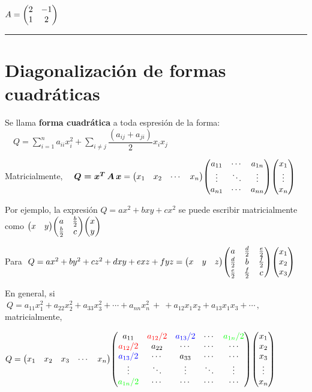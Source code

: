 $A=\mqty(2&-1\\1&2)$

\begin{center}
	\rule{200pt}{0.1pt}
\end{center}

\color{black}


\vspace{5mm}

\section{Diagonalización de formas cuadráticas}

Se llama \textbf{forma cuadrática} a toda espresión de la forma:
$\quad Q=\displaystyle \sum_{i=1}^n a_{ii}x_i^2 + \sum_{i\neq j} \dfrac{(a_{ij}+a_{ji})}{2} x_ix_j$

Matricialmente, $ \quad \boldsymbol{Q=x^T\, A\, x} = 
\mqty(x_1&x_2&\cdots &x_n) \mqty( a_{11} & \cdots  & a_{1n} \\ \vdots & \ddots & \vdots \\ a_{n1} & \cdots  & a_{nn}) \mqty(x_1\\ \vdots \\ x_n)$


Por ejemplo, la expresión $Q=ax^2+bxy+cx^2$ se puede escribir matricialmente como $\mqty(x&y) \mqty(a&\frac b 2 \\ \frac b 2 & c) \mqty(x\\y)$

Para $\ Q=ax^2+by^2+cz^2+dxy+exz+fyz=\mqty(x&y&z)\mqty(a&\frac d 2 & \frac e 2 \\ \frac d 2 & b & \frac f 2 \\ \frac e 2 & \frac f 2 & c) \mqty(x_1\\x_2\\x_3)$

En general, si $\ Q=a_{11}x_1^2+a_{22}x_2^2+a_{33}x_3^2+\cdots +a_{nn}x_n^2 \, + \ + a_{12}x_1x_2+a_{13}x_1x_3+ \cdots \, , \ $ matricialmente, 

$Q=\mqty(x_1&x_2&x_3&\cdots &x_n) 
\mqty(
a_{11}& \textcolor{red}{a_{12}/2} & \textcolor{blue}{a_{13}/2} & \cdots & \textcolor{green}{a_{1n}/2} \\
\textcolor{red}{a_{12}/2}& a_{22} & \cdots & \cdots & \cdots \\
\textcolor{blue}{a_{13}/2}& \cdots & a_{33} & \cdots & \cdots \\
\vdots & \ddots & \vdots & \ddots & \vdots \\
\textcolor{green}{a_{1n}/2} & \cdots & \cdots & \cdots & \cdots  )
\mqty(x_1\\x_2\\x_3\\ \vdots \\ x_n)$


